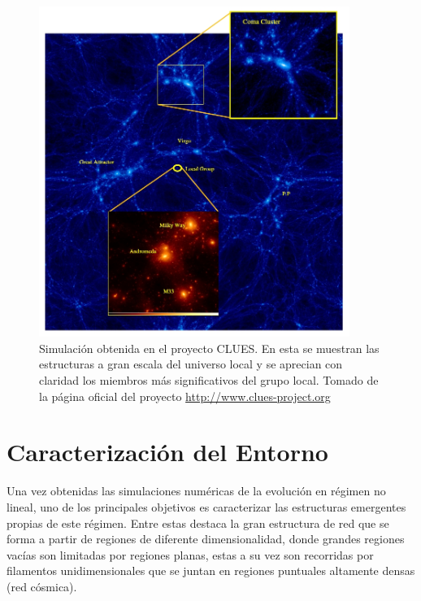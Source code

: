 \begin{figure}[htbp]
	\centering
	\includegraphics[width=0.90\textwidth]
	{./figures/3_nbody_simulations/CLUES_Overview.png}

	\caption{\small{Simulación obtenida en el proyecto CLUES. En esta se 
	muestran las estructuras a gran escala del universo local y se aprecian
	con claridad los miembros más significativos del grupo local. Tomado de 
	la 	página oficial del proyecto \url{http://www.clues-project.org}}}
	
	\label{fig:CLUES_Overview}
\end{figure}





\section{Caracterización del Entorno}
\label{sec:EnvironmentCharacterization}


Una vez obtenidas las simulaciones numéricas de la evolución en régimen no 
lineal, uno de los principales objetivos es caracterizar las estructuras 
emergentes propias de este régimen. Entre estas destaca la gran estructura 
de red que se forma a partir de regiones de diferente dimensionalidad, 
donde grandes regiones vacías son limitadas por regiones planas, estas a 
su vez son recorridas por filamentos unidimensionales que se juntan en regiones 
puntuales altamente densas (red cósmica). 


